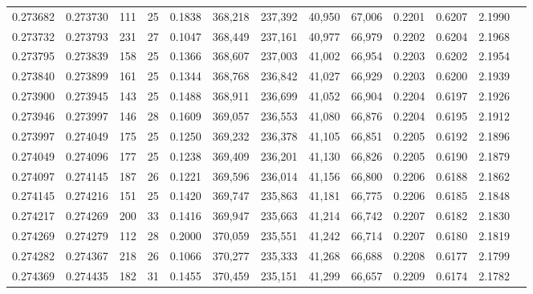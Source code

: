 \begin{tabular}{rrrrrrrrrrrrr}
0.273682 & 0.273730 &   111 &  25 &                                     0.1838 & 368,218 & 237,392 &  40,950 &  67,006 & 0.2201 & 0.6207 & 2.1990 \\
0.273732 & 0.273793 &   231 &  27 &                                     0.1047 & 368,449 & 237,161 &  40,977 &  66,979 & 0.2202 & 0.6204 & 2.1968 \\
0.273795 & 0.273839 &   158 &  25 &                                     0.1366 & 368,607 & 237,003 &  41,002 &  66,954 & 0.2203 & 0.6202 & 2.1954 \\
0.273840 & 0.273899 &   161 &  25 &                                     0.1344 & 368,768 & 236,842 &  41,027 &  66,929 & 0.2203 & 0.6200 & 2.1939 \\
0.273900 & 0.273945 &   143 &  25 &                                     0.1488 & 368,911 & 236,699 &  41,052 &  66,904 & 0.2204 & 0.6197 & 2.1926 \\
0.273946 & 0.273997 &   146 &  28 &                                     0.1609 & 369,057 & 236,553 &  41,080 &  66,876 & 0.2204 & 0.6195 & 2.1912 \\
0.273997 & 0.274049 &   175 &  25 &                                     0.1250 & 369,232 & 236,378 &  41,105 &  66,851 & 0.2205 & 0.6192 & 2.1896 \\
0.274049 & 0.274096 &   177 &  25 &                                     0.1238 & 369,409 & 236,201 &  41,130 &  66,826 & 0.2205 & 0.6190 & 2.1879 \\
0.274097 & 0.274145 &   187 &  26 &                                     0.1221 & 369,596 & 236,014 &  41,156 &  66,800 & 0.2206 & 0.6188 & 2.1862 \\
0.274145 & 0.274216 &   151 &  25 &                                     0.1420 & 369,747 & 235,863 &  41,181 &  66,775 & 0.2206 & 0.6185 & 2.1848 \\
0.274217 & 0.274269 &   200 &  33 &                                     0.1416 & 369,947 & 235,663 &  41,214 &  66,742 & 0.2207 & 0.6182 & 2.1830 \\
0.274269 & 0.274279 &   112 &  28 &                                     0.2000 & 370,059 & 235,551 &  41,242 &  66,714 & 0.2207 & 0.6180 & 2.1819 \\
0.274282 & 0.274367 &   218 &  26 &                                     0.1066 & 370,277 & 235,333 &  41,268 &  66,688 & 0.2208 & 0.6177 & 2.1799 \\
0.274369 & 0.274435 &   182 &  31 &                                     0.1455 & 370,459 & 235,151 &  41,299 &  66,657 & 0.2209 & 0.6174 & 2.1782 \\

\end{tabular}
